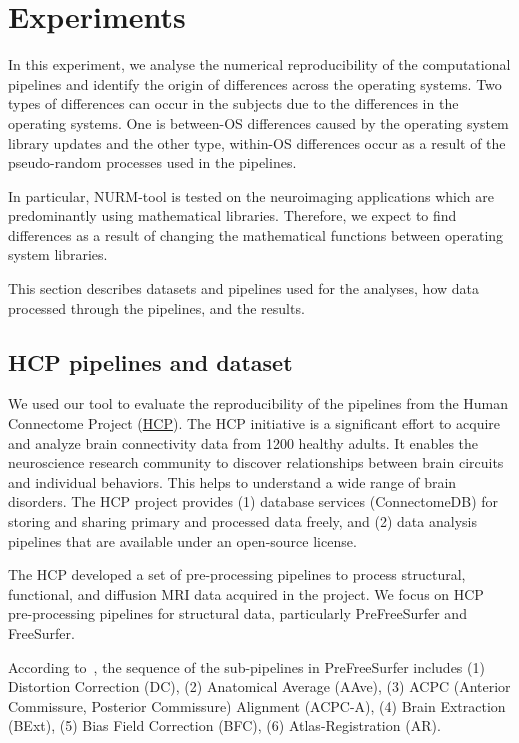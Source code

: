\documentclass[a4paper,num-refs]{oup-contemporary}
\begin{document}
\section{Experiments}

In this experiment, we analyse the numerical reproducibility of the computational pipelines 
and identify the origin of differences across the operating systems. 
Two types of differences can occur in the subjects due to the differences
in the operating systems. One is between-OS differences caused by the
operating system library updates and the other type, within-OS differences
occur as a result of the pseudo-random processes used in the pipelines.

In particular, NURM-tool is tested on the neuroimaging applications which are 
predominantly using mathematical libraries. Therefore, we expect to find 
differences as a result of changing the mathematical functions between operating system libraries.

This section describes datasets and pipelines used for the analyses, 
how data processed through the pipelines, and the results.


\subsection{HCP pipelines and dataset}

We used our tool to evaluate the reproducibility of the pipelines from the Human Connectome 
Project (\href{https://www.humanconnectome.org}{HCP}).
The HCP initiative is a significant effort to acquire and analyze 
brain connectivity data from 1200 healthy adults.
It enables the neuroscience 
research community to discover relationships between brain circuits and 
individual behaviors. This helps to understand a wide range of brain disorders.
The HCP project provides (1) database services (ConnectomeDB) for storing and 
sharing primary and processed data freely, and (2) data analysis pipelines that 
are available under an open-source license.

The HCP developed a set of pre-processing pipelines to process structural,
functional, and diffusion MRI data acquired in the project. We focus on HCP
pre-processing pipelines for structural data, particularly PreFreeSurfer
and FreeSurfer. 

According to~\cite{glasser2013}, the sequence of the 
sub-pipelines in PreFreeSurfer includes 
(1) Distortion Correction (DC), 
(2) Anatomical Average (AAve), 
(3) ACPC (Anterior Commissure, Posterior Commissure) Alignment (ACPC-A), 
(4) Brain Extraction (BExt), 
(5) Bias Field Correction (BFC), 
(6) Atlas-Registration (AR).
\end{document}
